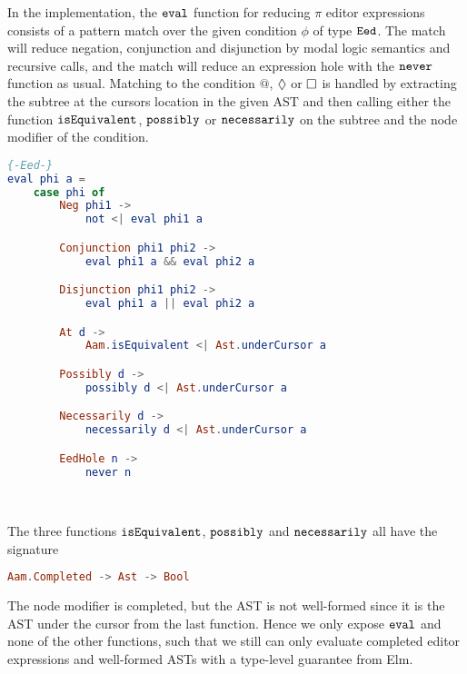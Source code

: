 In the implementation, the $\texttt{eval}$ function for reducing $\pi$ editor
expressions consists of a pattern match over the given condition $\phi$ of type
$\texttt{Eed}$. The match will reduce negation, conjunction and disjunction by
modal logic semantics and recursive calls, and the match will reduce an
expression hole with the $\texttt{never}$ function as usual. Matching to the
condition $@$, $\possibly$ or $\necessarily$ is handled by extracting the
subtree at the cursors location in the given AST and then calling either the
function $\texttt{isEquivalent}$, $\texttt{possibly}$ or $\texttt{necessarily}$ on the
subtree and the node modifier of the condition.
\begin{lstlisting}[language=elm,%
                   label="eval-eed",%
                   gobble=0,%
                   ]
{-Eed-}
eval phi a =
    case phi of
        Neg phi1 ->
            not <| eval phi1 a

        Conjunction phi1 phi2 ->
            eval phi1 a && eval phi2 a

        Disjunction phi1 phi2 ->
            eval phi1 a || eval phi2 a

        At d ->
            Aam.isEquivalent <| Ast.underCursor a

        Possibly d ->
            possibly d <| Ast.underCursor a

        Necessarily d ->
            necessarily d <| Ast.underCursor a

        EedHole n ->
            never n
\end{lstlisting}
~

The three functions $\texttt{isEquivalent}$, $\texttt{possibly}$ and
$\texttt{necessarily}$ all have the signature
\begin{lstlisting}[language=elm,%
                   label="eval-eed-signature",%
                   gobble=0,%
                   ]
Aam.Completed -> Ast -> Bool
\end{lstlisting}
The node modifier is completed, but the AST is not well-formed since it
is the AST under the cursor from the last function. Hence we only expose
$\texttt{eval}$ and none of the other functions, such that we still can only
evaluate completed editor expressions and well-formed ASTs with a type-level
guarantee from Elm. \\

